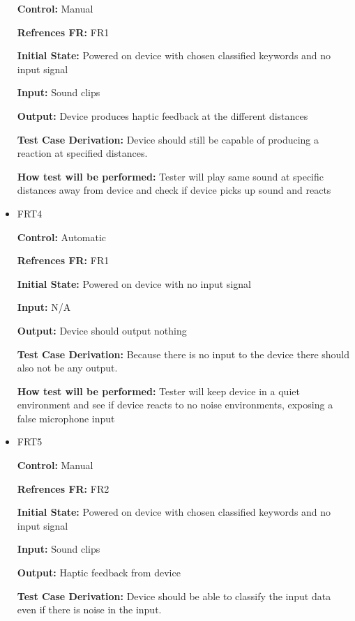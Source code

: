 \documentclass[12pt, titlepage]{article}
\begin{document}
\begin{itemize}
\textbf{Control:} Manual

\textbf{Refrences FR:} FR1 					

\textbf{Initial State:} Powered on device with chosen classified keywords and no input signal 
					
\textbf{Input:} Sound clips
					
\textbf{Output:} Device produces haptic feedback at the different distances

\textbf{Test Case Derivation:} Device should still be capable of producing a reaction at specified distances.
					
\textbf{How test will be performed:}  Tester will play same sound at specific distances away from device and check if device picks up sound and reacts


\item{FRT4}

\textbf{Control:} Automatic

\textbf{Refrences FR:} FR1 					

\textbf{Initial State:} Powered on device with no input signal 
					
\textbf{Input:} N/A
					
\textbf{Output:} Device should output nothing

\textbf{Test Case Derivation:} Because there is no input to the device there should also not be any output.
					
\textbf{How test will be performed:} Tester will keep device in a quiet environment and see if device reacts to no noise environments, exposing a false microphone input 


\item{FRT5}

\textbf{Control:} Manual

\textbf{Refrences FR:} FR2 					

\textbf{Initial State:} Powered on device with chosen classified keywords and no input signal 
					
\textbf{Input:} Sound clips
					
\textbf{Output:} Haptic feedback from device

\textbf{Test Case Derivation:} Device should be able to classify the input data even if there is noise in the input.
					

\end{itemize}
\end{document}
